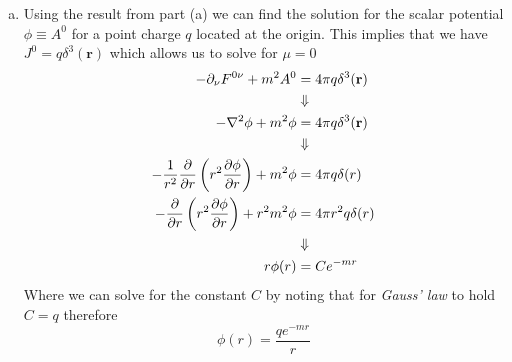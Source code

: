 \documentclass[11pt]{article}
\numberwithin{equation}{section}
\begin{document}
\begin{enumerate}[(a)]
\item
    Using the result from part (a) we can find the solution for the scalar potential $\phi\equiv{A^{0}}$ for a point
    charge $q$ located at the origin. This implies that we have $J^{0} = q\delta^{3}(\mathbf{r})$ which allows us to 
    solve for $\mu=0$
    \begin{align*}
        -\partial_{\nu}F^{0\nu} + m^2A^{0} &= 4\pi q\delta^{3}(\mathbf{r})\\
                                           &\Downarrow\\
        -\bold\nabla^2\phi + m^2\phi &= 4\pi q\delta^{3}(\mathbf{r})\\
                                           &\Downarrow\\
        -\frac{1}{r^2}\frac{\partial{}}{\partial{r}}\left(r^2\frac{\partial{\phi}}{\partial{r}}\right) + m^2\phi &= 4\pi q\delta(r)\\
        -\frac{\partial{}}{\partial{r}}\left(r^2\frac{\partial{\phi}}{\partial{r}}\right) + r^2m^2\phi &= 4\pi r^2q\delta(r)\\
                                           &\Downarrow\\
                                  r\phi(r) &= Ce^{-mr}
    \end{align*}
    Where we can solve for the constant $C$ by noting that for \emph{Gauss' law} to hold $C=q$ therefore
    $$\phi(r) = \frac{qe^{-mr}}{r}$$

\end{enumerate}

\pagebreak
\end{document}
